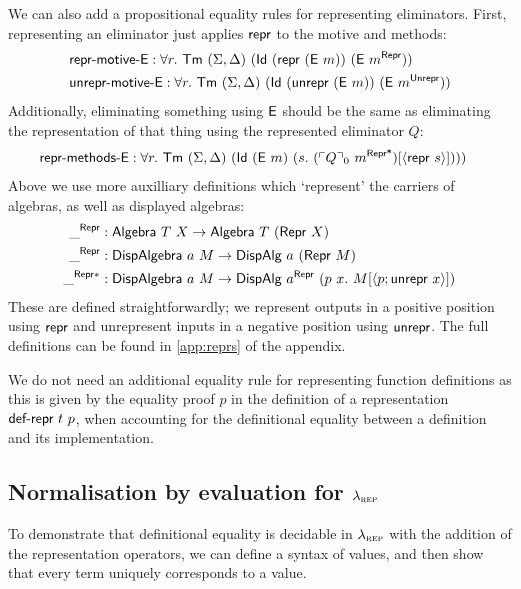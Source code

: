 We can also add a propositional equality rules for representing eliminators.
First, representing an eliminator just applies $\textsf{repr}$ to the motive and methods:
\begin{align*}
&\mta{repr-motive-E} : \forall r.\ \Tm\ (\Sigma, \Delta)\ (\mta{Id}\ (\Mrepr\ (\mta{E}\ m))\ (\mta{E}\ m^\mta{Repr})) \\
&\mta{unrepr-motive-E} : \forall r.\ \Tm\ (\Sigma, \Delta)\ (\mta{Id}\ (\Munrepr\ (\mta{E}\ m))\ (\mta{E}\ m^\mta{Unrepr}))
\end{align*}
Additionally, eliminating something using $\textsf{E}$ should be the same as
eliminating the representation of that thing using the represented eliminator $Q$:
\begin{align*}
&\mta{repr-methods-E} : \forall r.\ \Tm\ (\Sigma, \Delta)\ (\mta{Id}\ (\mta{E}\ m)\ (s.\ (\emb{Q}_0\ m^{\mta{Repr*}})[\Msub{\mta{repr}\ s}])))
\end{align*}
Above we use more auxilliary definitions which `represent' the carriers of
algebras, as well as displayed algebras:
\begin{align*}
\_^{\mta{Repr}} &: \mta{Algebra}\ T\ X \to \mta{Algebra}\ T\ (\mta{Repr}\ X) \\
 \_^{\mta{Repr}} &: \mta{DispAlgebra}\ a\ M \to \mta{DispAlg}\ a\ (\MRepr\ M) \\
 \_^{\mta{Repr}*} &: \mta{DispAlgebra}\ a\ M \to \mta{DispAlg}\ a^{\mta{Repr}}\ (p\ x .\ M[\Msub{p;\mta{unrepr}\ x}])
\end{align*}
These are defined straightforwardly; we represent outputs in a positive position
using $\textsf{repr}$ and unrepresent inputs in a negative position using
$\textsf{unrepr}$. The full definitions can be found in \cref{app:reprs} of the
appendix.

We do not need an additional equality rule for representing function definitions
as this is given by the equality proof $p$ in the definition of a
representation $\textsf{def-repr}\ t\ p$, when accounting for the definitional
equality between a definition and its implementation.

\subsection{Normalisation by evaluation for $\lambda_{\textsc{rep}}$}

To demonstrate that definitional equality is decidable in $\lambda_{\textsc{rep}}$ with the addition
of the representation operators, we can define a syntax of values, and then show that
every term uniquely corresponds to a value.


